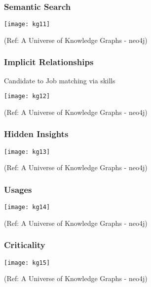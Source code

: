 \begin{frame}[fragile]\frametitle{Semantic Search}
 
 
			\begin{center}
			\texttt{[image: kg11]}
			\end{center}	
			
			{\tiny (Ref: A Universe of Knowledge Graphs - neo4j)}
		
	
\end{frame}

\begin{frame}[fragile]\frametitle{Implicit Relationships}
 
	Candidate to Job matching via skills
 
			\begin{center}
			\texttt{[image: kg12]}
			\end{center}	
			
			{\tiny (Ref: A Universe of Knowledge Graphs - neo4j)}
		
	
\end{frame}

\begin{frame}[fragile]\frametitle{Hidden Insights}
 
 
			\begin{center}
			\texttt{[image: kg13]}
			\end{center}	
			
			{\tiny (Ref: A Universe of Knowledge Graphs - neo4j)}
		
	
\end{frame}

\begin{frame}[fragile]\frametitle{Usages}
 
 
			\begin{center}
			\texttt{[image: kg14]}
			\end{center}	
			
			{\tiny (Ref: A Universe of Knowledge Graphs - neo4j)}
		
	
\end{frame}

\begin{frame}[fragile]\frametitle{Criticality}
 
 
			\begin{center}
			\texttt{[image: kg15]}
			\end{center}	
			
			{\tiny (Ref: A Universe of Knowledge Graphs - neo4j)}
		
	
\end{frame}

